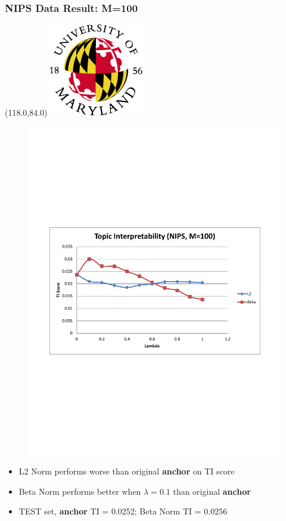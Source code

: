 \documentclass{beamer}
\let\oldframetitle\frametitle
\renewcommand{\frametitle}[1]{
\oldframetitle{#1}
\BottomLogo
}
\newcommand{\BottomLogo}{
\begin{textblock}{14}(118.0,84.0)
\includegraphics[height=.8cm]{figures/umd-logo1.jpg}
\end{textblock}
}
\begin{document}
\begin{frame}
\frametitle{NIPS Data Result: M=100}
\begin{figure}
\includegraphics[width=0.7\linewidth]{figures/NIPS_M_100_TI.pdf}
\end{figure}
\vspace{-0.1in}
\begin{itemize}
\item L2 Norm performs worse than original {\bf anchor} on TI score
\item Beta Norm performs better when $\lambda=0.1$ than original {\bf anchor}
\item TEST set, {\bf anchor} TI = 0.0252; Beta Norm TI = 0.0256
\end{itemize}

\end{frame}
\end{document}
